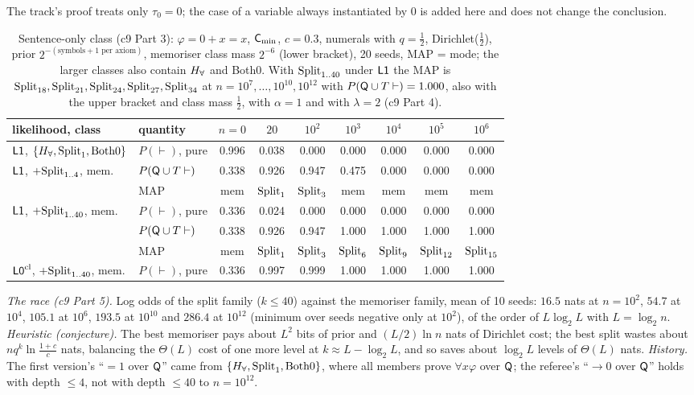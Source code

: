 The track's proof treats only $\tau_0=0$; the case of a variable always instantiated by $0$ is added here and does not change the conclusion.

\begin{table}[ht]
\centering\small
\setlength{\tabcolsep}{4pt}
\begin{tabular}{@{}llccccccc@{}}
\toprule
likelihood, class & quantity & $n=0$ & $20$ & $10^2$ & $10^3$ & $10^4$ & $10^5$ & $10^6$\\
\midrule
$\mathord{\mathsf{L1}}$, $\{H_{\forall},\mathrm{Split}_1,\mathrm{Both0}\}$ & $P(\vdash)$, pure & 0.996 & 0.038 & 0.000 & 0.000 & 0.000 & 0.000 & 0.000\\
$\mathord{\mathsf{L1}}$, $+\mathrm{Split}_{1..4}$, mem. & $P(\mathsf{Q}\cup T\vdash)$ & 0.338 & 0.926 & 0.947 & 0.475 & 0.000 & 0.000 & 0.000\\
 & MAP & mem & $\mathrm{Split}_1$ & $\mathrm{Split}_3$ & mem & mem & mem & mem\\
$\mathord{\mathsf{L1}}$, $+\mathrm{Split}_{1..40}$, mem. & $P(\vdash)$, pure & 0.336 & 0.024 & 0.000 & 0.000 & 0.000 & 0.000 & 0.000\\
 & $P(\mathsf{Q}\cup T\vdash)$ & 0.338 & 0.926 & 0.947 & 1.000 & 1.000 & 1.000 & 1.000\\
 & MAP & mem & $\mathrm{Split}_1$ & $\mathrm{Split}_3$ & $\mathrm{Split}_6$ & $\mathrm{Split}_9$ & $\mathrm{Split}_{12}$ & $\mathrm{Split}_{15}$\\
$\mathord{\mathsf{L0}}^{\mathrm{cl}}$, $+\mathrm{Split}_{1..40}$, mem. & $P(\vdash)$, pure & 0.336 & 0.997 & 0.999 & 1.000 & 1.000 & 1.000 & 1.000\\
\bottomrule
\end{tabular}
\caption{Sentence-only class (c9 Part 3): $\varphi=0+x=x$, $\mathsf{C}_{\min}$, $c=0.3$, numerals with $q=\tfrac12$, Dirichlet($\tfrac12$), prior $2^{-(\text{symbols}+1\text{ per axiom})}$, memoriser class mass $2^{-6}$ (lower bracket), 20 seeds, MAP = mode; the larger classes also contain $H_{\forall}$ and Both0. With $\mathrm{Split}_{1..40}$ under $\mathord{\mathsf{L1}}$ the MAP is $\mathrm{Split}_{18},\mathrm{Split}_{21},\mathrm{Split}_{24},\mathrm{Split}_{27},\mathrm{Split}_{34}$ at $n=10^7,\dots,10^{10},10^{12}$ with $P(\mathsf{Q}\cup T\vdash)=1.000$, also with the upper bracket and class mass $\tfrac12$, with $\alpha=1$ and with $\lambda=2$ (c9 Part 4).}
\label{tab:univ:sentences}
\end{table}

\emph{The race (c9 Part 5).} Log odds of the split family ($k\le40$) against the memoriser family, mean of 10 seeds: $16.5$ nats at $n=10^2$, $54.7$ at $10^4$, $105.1$ at $10^6$, $193.5$ at $10^{10}$ and $286.4$ at $10^{12}$ (minimum over seeds negative only at $10^2$), of the order of $L\log_2L$ with $L=\log_2n$. \emph{Heuristic (conjecture).} The best memoriser pays about $L^2$ bits of prior and $(L/2)\ln n$ nats of Dirichlet cost; the best split wastes about $nq^k\ln\frac{1+c}c$ nats, balancing the $\Theta(L)$ cost of one more level at $k\approx L-\log_2L$, and so saves about $\log_2L$ levels of $\Theta(L)$ nats. \emph{History.} The first version's ``$=1$ over $\mathsf{Q}$'' came from $\{H_{\forall},\mathrm{Split}_1,\mathrm{Both0}\}$, where all members prove $\forall x\varphi$ over $\mathsf{Q}$; the referee's ``$\to0$ over $\mathsf{Q}$'' holds with depth $\le4$, not with depth $\le40$ to $n=10^{12}$.
